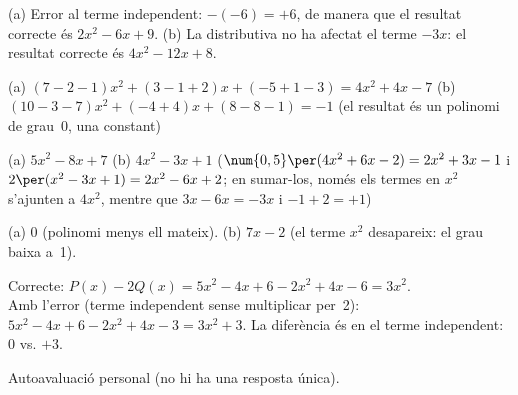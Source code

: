 \begin{solucions}
\begin{sollist}
  \item (a) Error al terme independent: $-(- 6)=+6$, de manera que el resultat
        correcte és $2x^2-6x+9$. \quad
        (b) La distributiva no ha afectat el terme $-3x$: el resultat
        correcte és $4x^2-12x+8$.
  \item (a) $(7-2-1)x^2+(3-1+2)x+(-5+1-3) = 4x^2+4x-7$ \quad
        (b) $(10-3-7)x^2+(-4+4)x+(8-8-1) = -1$
        (el resultat és un polinomi de grau~0, una constant)
  \item (a) $5x^2-8x+7$ \quad (b) $4x^2-3x+1$
        ($\num{0,5}\per(4x^2+6x-2)=2x^2+3x-1$ i $2\per(x^2-3x+1)=2x^2-6x+2$;
        en sumar-los, només els termes en $x^2$ s'ajunten a $4x^2$, mentre que
        $3x-6x=-3x$ i $-1+2=+1$)
  \item (a) $0$ (polinomi menys ell mateix). \quad
        (b) $7x-2$ (el terme $x^2$ desapareix: el grau baixa a~1).
  \item Correcte: $P(x)-2Q(x)=5x^2-4x+6-2x^2+4x-6=3x^2$. \\
        Amb l'error (terme independent sense multiplicar per~2):
        $5x^2-4x+6-2x^2+4x-3=3x^2+3$. La diferència és en el terme
        independent: $0$ vs. $+3$.
  \item Autoavaluació personal (no hi ha una resposta única).
\end{sollist}
\end{solucions}
